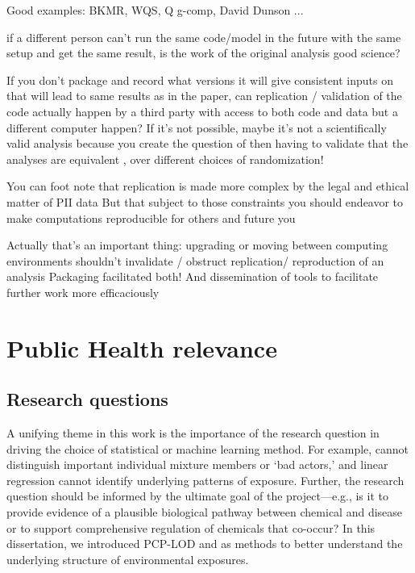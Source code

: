 Good examples: BKMR, WQS, Q g-comp, David Dunson ...

if a different person can’t run the same code/model in the future with the same setup and get the same result, is the work of the original analysis good science?

If you don’t package and record what versions it will give consistent inputs on that will lead to same results as in the paper, can replication / validation of the code actually happen by a third party with access to both code and data but a different computer happen? If it’s not possible, maybe it’s not a scientifically valid analysis because you create the question of then having to validate that the analyses are equivalent , over different choices of randomization!

You can foot note that replication is made more complex by the legal and ethical matter of PII data 
But that subject to those constraints you should endeavor to make computations reproducible for others and future you

Actually that’s an important thing: upgrading or moving between computing environments shouldn’t invalidate / obstruct replication/ reproduction of an analysis
Packaging facilitated both! And dissemination of tools to facilitate further work more efficaciously

\section{Public Health relevance}\label{sec:ph}
\subsection{Research questions}\label{sec:question}
A unifying theme in this work is the importance of the research question in driving the choice of statistical or machine learning method. For example, \bnmf cannot distinguish important individual mixture members or `bad actors,' and linear regression cannot identify underlying patterns of exposure. Further, the research question should be informed by the ultimate goal of the project---e.g., is it to provide evidence of a plausible biological pathway between chemical and disease or to support comprehensive regulation of chemicals that co-occur? In this dissertation, we introduced PCP-LOD and \bnmf as methods to better understand the underlying structure of environmental exposures.

